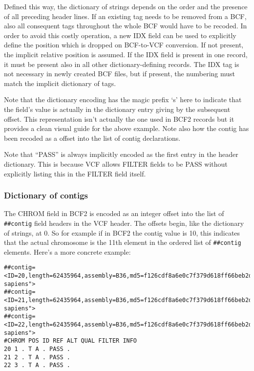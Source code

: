 \documentclass[8pt]{article}
\begin{document}
Defined this way, the dictionary of strings depends on the order and the presence of all preceding header lines.
If an existing tag needs to be removed from a BCF, also all consequent tags throughout the whole BCF would have to be recoded.
In order to avoid this costly operation, a new IDX field can be used to explicitly define the position which is dropped on BCF-to-VCF conversion.
If not present, the implicit relative position is assumed.
If the IDX field is present in one record, it must be present also in all other dictionary-defining records.
The IDX tag is not necessary in newly created BCF files, but if present, the numbering must match the implicit dictionary of tags.

Note that the dictionary encoding has the magic prefix `s' here to indicate that the field's value is actually in the dictionary entry giving by the subsequent offset.
This representation isn't actually the one used in BCF2 records but it provides a clean visual guide for the above example.
Note also how the contig has been recoded as a offset into the list of contig declarations.

Note that ``PASS'' is always implicitly encoded as the first entry in the header dictionary.
This is because VCF allows FILTER fields to be PASS without explicitly listing this in the FILTER field itself.


\subsubsection{Dictionary of contigs}

The CHROM field in BCF2 is encoded as an integer offset into the list of \verb|##contig| field headers in the VCF header.
The offsets begin, like the dictionary of strings, at 0.
So for example if in BCF2 the contig value is 10, this indicates that the actual chromosome is the 11th element in the ordered list of \verb|##contig| elements.
Here's a more concrete example:

\small
\begin{verbatim}
##contig=<ID=20,length=62435964,assembly=B36,md5=f126cdf8a6e0c7f379d618ff66beb2da,species="Homo sapiens">
##contig=<ID=21,length=62435964,assembly=B36,md5=f126cdf8a6e0c7f379d618ff66beb2da,species="Homo sapiens">
##contig=<ID=22,length=62435964,assembly=B36,md5=f126cdf8a6e0c7f379d618ff66beb2da,species="Homo sapiens">
#CHROM POS ID REF ALT QUAL FILTER INFO
20 1 . T A . PASS .
21 2 . T A . PASS .
22 3 . T A . PASS .
\end{verbatim}
\normalsize
\end{document}
